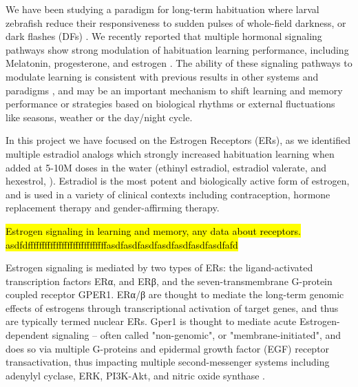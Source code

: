 \documentclass[9pt,lineno]{RandlettLab_elife}
\begin{document}
We have been studying a paradigm for long-term habituation where larval zebrafish reduce their responsiveness to sudden pulses of whole-field darkness, or dark flashes (DFs) \citep{wolman_chemical_2011, Randlett2019-fj, Lamire2023-he}. 
We recently reported that multiple hormonal signaling pathways show strong modulation of habituation learning performance, including Melatonin, progesterone, and estrogen \citep{Lamire2023-he}. 
The ability of these signaling pathways to modulate learning is consistent with previous results in other systems and paradigms \citep{Nilsson2002-as, Naderi2020-ot, Dillon2013-rk, Rawashdeh2007-bw, Jilg2019-oy, El-Sherif2003-vt, Barros2015-jm}, and may be an important mechanism to shift learning and memory performance or strategies based on biological rhythms or external fluctuations like seasons, weather or the day/night cycle.

In this project we have focused on the Estrogen Receptors (ERs), as we identified multiple estradiol analogs which strongly increased habituation learning when added at 5-10\textmu M doses in the water (ethinyl estradiol, estradiol valerate, and hexestrol, \citealp{Lamire2023-he}).
Estradiol is the most potent and biologically active form of estrogen, and is used in a variety of clinical contexts including contraception, hormone replacement therapy and gender-affirming therapy.  

\hl{Estrogen signaling in learning and memory, any data about receptors. asdfdffffffffffffffffffffffffffffasdfasdfasdfasdfasdfasdfasdfafd}

Estrogen signaling is mediated by two types of ERs: the ligand-activated transcription factors ERα, and ERβ, and the seven-transmembrane G-protein coupled receptor GPER1.
ERα/β are thought to mediate the long-term genomic effects of estrogens through transcriptional activation of target genes, and thus are typically termed nuclear ERs.
Gper1 is thought to mediate acute Estrogen-dependent signaling -- often called "non-genomic", or "membrane-initiated", and does so via multiple G-proteins and epidermal
growth factor (EGF) receptor transactivation, thus impacting multiple second-messenger systems including adenylyl cyclase, ERK, PI3K-Akt, and nitric oxide synthase \citep{Prossnitz2023-uo, Revankar2005-ww, Filardo2000-yz}. 
\end{document}
